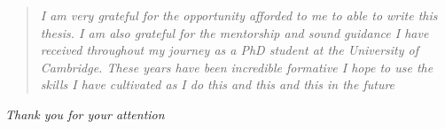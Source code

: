 \pagebreak
\hspace{0pt}
\vspace*{\fill}
\begin{quote}\emph{
I am very grateful for the opportunity afforded to me to able to write this thesis.
I am also grateful for the mentorship and sound guidance I have received throughout my journey as a PhD student at the University of Cambridge.
These years have been incredible formative
I hope to use the skills I have cultivated as I do this and this and this in the future
}
\end{quote}
\mbox{}\hfill \emph{Thank you for your attention}
\vspace*{\fill}
\hspace{0pt}
\nocite{bairdFrontalLobeActivation2002}
\nocite{simmonsKissMakeUp2002}

